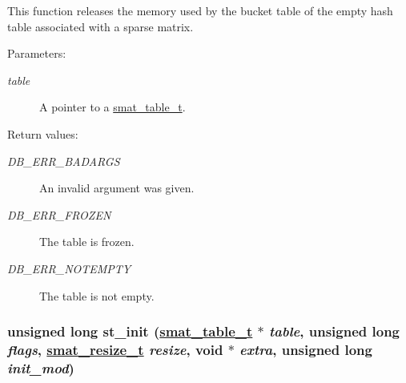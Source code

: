 This function releases the memory used by the bucket table of the empty hash table associated with a sparse matrix.\begin{Desc}
\item[Parameters: ]\par
\begin{description}
\item[{\em 
table}]A pointer to a \hyperlink{group__dbprim__smat_a0}{smat\_\-table\_\-t}.\end{description}
\end{Desc}
\begin{Desc}
\item[Return values: ]\par
\begin{description}
\item[{\em 
DB\_\-ERR\_\-BADARGS}]An invalid argument was given. \item[{\em 
DB\_\-ERR\_\-FROZEN}]The table is frozen. \item[{\em 
DB\_\-ERR\_\-NOTEMPTY}]The table is not empty. \end{description}
\end{Desc}
\hypertarget{group__dbprim__smat_a9}{
\subsubsection[st\_\-init]{\setlength{\rightskip}{0pt plus 5cm}unsigned long st\_\-init (\hyperlink{group__dbprim__smat_a0}{smat\_\-table\_\-t} $\ast$ {\em table}, unsigned long {\em flags}, \hyperlink{group__dbprim__smat_a3}{smat\_\-resize\_\-t} {\em resize}, void $\ast$ {\em extra}, unsigned long {\em init\_\-mod})}}
\label{group__dbprim__smat_a9}


